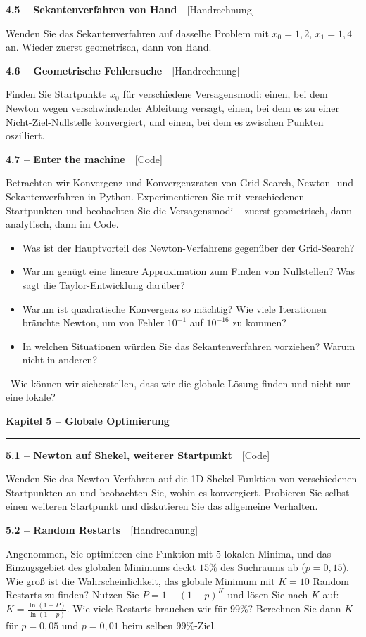 \documentclass[a4paper,10pt]{article}
\newcommand{\kapitel}[1]{%
  \par\vspace{7pt}
  {\large\bfseries\color{accent} #1}\par
  \noindent\textcolor{accent}{\rule{\linewidth}{0.8pt}}\par\vspace{2pt}}
\newcommand{\aufg}[2]{%
  \par\vspace{3pt}
  {\bfseries\color{accent2} #1}~~{\footnotesize\color{accent2}[#2]}\par\vspace{1pt}}
\newcommand{\teaser}[1]{%
  \par\vspace{2pt}{\color{accent4}\textbf{Denkanstoß.}}~#1\par}
\newcommand{\marg}[1]{\par\vspace{1pt}{\footnotesize\itshape Randnotiz: #1}\par}
\newcommand{\reflexion}{%
  \par\vspace{2pt}{\bfseries\color{accent3} Selbstreflexionsfragen}\par\vspace{1pt}}
\begin{document}
\aufg{4.5 \;--\; Sekantenverfahren von Hand}{Handrechnung}
Wenden Sie das Sekantenverfahren auf dasselbe Problem mit $x_0=1{,}2$, $x_1=1{,}4$
an. Wieder zuerst geometrisch, dann von Hand.

\aufg{4.6 \;--\; Geometrische Fehlersuche}{Handrechnung}
Finden Sie Startpunkte $x_0$ für verschiedene Versagensmodi: einen, bei dem Newton
wegen verschwindender Ableitung versagt, einen, bei dem es zu einer Nicht-Ziel-Nullstelle
konvergiert, und einen, bei dem es zwischen Punkten oszilliert.

\aufg{4.7 \;--\; Enter the machine}{Code}
Betrachten wir Konvergenz und Konvergenzraten von Grid-Search, Newton- und
Sekantenverfahren in Python. Experimentieren Sie mit verschiedenen Startpunkten und
beobachten Sie die Versagensmodi -- zuerst geometrisch, dann analytisch, dann im Code.

\reflexion
\begin{itemize}
  \item Was ist der Hauptvorteil des Newton-Verfahrens gegenüber der Grid-Search?
  \item Warum genügt eine lineare Approximation zum Finden von Nullstellen? Was sagt
        die Taylor-Entwicklung darüber?
  \item Warum ist quadratische Konvergenz so mächtig? Wie viele Iterationen bräuchte
        Newton, um von Fehler $10^{-1}$ auf $10^{-16}$ zu kommen?
  \item In welchen Situationen würden Sie das Sekantenverfahren vorziehen? Warum nicht
        in anderen?
\end{itemize}

\teaser{Wie können wir sicherstellen, dass wir die globale Lösung finden und nicht
nur eine lokale?}

\kapitel{Kapitel 5 \;--\; Globale Optimierung}

\aufg{5.1 \;--\; Newton auf Shekel, weiterer Startpunkt}{Code}
Wenden Sie das Newton-Verfahren auf die 1D-Shekel-Funktion von verschiedenen
Startpunkten an und beobachten Sie, wohin es konvergiert. Probieren Sie selbst einen
weiteren Startpunkt und diskutieren Sie das allgemeine Verhalten.
\marg{Wie würden Sie die Update-Regel abändern, um stattdessen Maxima zu finden?}

\aufg{5.2 \;--\; Random Restarts}{Handrechnung}
Angenommen, Sie optimieren eine Funktion mit $5$ lokalen Minima, und das Einzugsgebiet
des globalen Minimums deckt $15\%$ des Suchraums ab ($p=0{,}15$). Wie groß ist die
Wahrscheinlichkeit, das globale Minimum mit $K=10$ Random Restarts zu finden?
Nutzen Sie $P=1-(1-p)^K$ und lösen Sie nach $K$ auf:
$K=\frac{\ln(1-P)}{\ln(1-p)}$. Wie viele Restarts brauchen wir für $99\%$? Berechnen
Sie dann $K$ für $p=0{,}05$ und $p=0{,}01$ beim selben $99\%$-Ziel.
\end{document}
